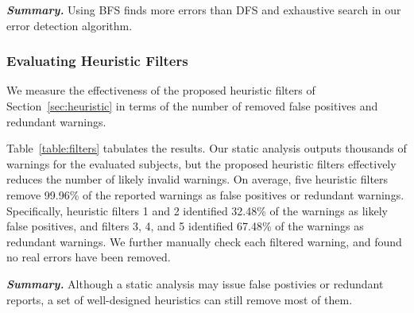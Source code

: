 \vspace{1mm}

\noindent \textbf{\textit{Summary.}} Using BFS finds more errors than DFS and
exhaustive search in our error detection algorithm. 


\subsubsection{Evaluating Heuristic Filters}
\label{sec:filters}

We measure the effectiveness of the proposed heuristic filters of
Section~\ref{sec:heuristic} in terms of the number of removed false positives and
redundant warnings.

Table~\ref{table:filters} tabulates the results.
Our static analysis outputs thousands of warnings for the evaluated
subjects, but the proposed heuristic filters effectively reduces
the number of likely invalid warnings. On average, five heuristic
filters remove 99.96\% of the reported warnings as false positives
or redundant warnings. Specifically, heuristic filters 1 and 2 identified
32.48\% of the warnings as likely false positives, and filters 3, 4,
and 5 identified 67.48\% of the warnings as redundant warnings.
We further manually check each filtered warning, and found no
real errors have been removed.

\vspace{1mm}

\noindent \textbf{\textit{Summary.}} Although a static analysis may
issue false postivies or redundant reports, a set of well-designed
heuristics can still remove most of them.

